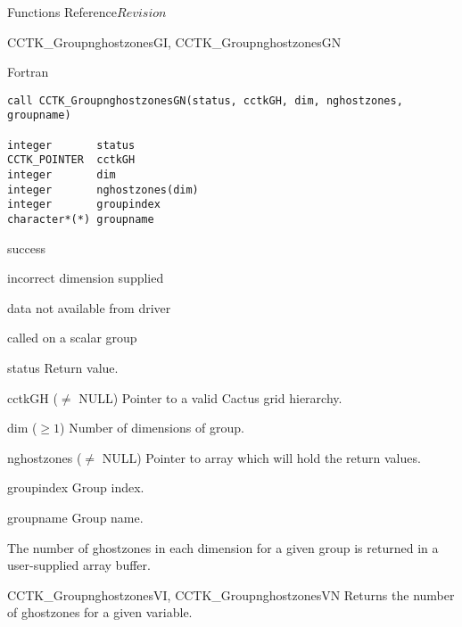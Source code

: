 \begin{cactuspart}{ Functions Reference}{}{$Revision$}
\begin{FunctionDescription}{CCTK\_GroupnghostzonesGI, CCTK\_GroupnghostzonesGN}
\begin{SynopsisSection}
\begin{Synopsis}{Fortran}
\begin{verbatim}
call CCTK_GroupnghostzonesGN(status, cctkGH, dim, nghostzones, groupname)

integer       status
CCTK_POINTER  cctkGH
integer       dim
integer       nghostzones(dim)
integer       groupindex
character*(*) groupname
\end{verbatim}
\end{Synopsis}
\end{SynopsisSection}

\begin{ResultSection}
\begin{Result}{0} success \end{Result}
\begin{Result}{-1} incorrect dimension supplied \end{Result}
\begin{Result}{-2} data not available from driver \end{Result}
\begin{Result}{-3} called on a scalar group \end{Result}
\end{ResultSection}

\begin{ParameterSection}
\begin{Parameter}{status} Return value. \end{Parameter}
\begin{Parameter}{cctkGH ($\ne$ NULL)} Pointer to a valid Cactus grid hierarchy. \end{Parameter}
\begin{Parameter}{dim ($\ge 1$)} Number of dimensions of group. \end{Parameter}
\begin{Parameter}{nghostzones ($\ne$ NULL)} Pointer to array which will hold the return values. \end{Parameter}
\begin{Parameter}{groupindex} Group index. \end{Parameter}
\begin{Parameter}{groupname} Group name. \end{Parameter}
\end{ParameterSection}

\begin{Discussion}
The number of ghostzones in each dimension for a given group is returned in a user-supplied array buffer.
\end{Discussion}

\begin{SeeAlsoSection}
\begin{SeeAlso}{CCTK\_GroupnghostzonesVI, CCTK\_GroupnghostzonesVN}
Returns the number of ghostzones for a given variable.
\end{SeeAlso}
\end{SeeAlsoSection}
\end{FunctionDescription}



\end{cactuspart}
